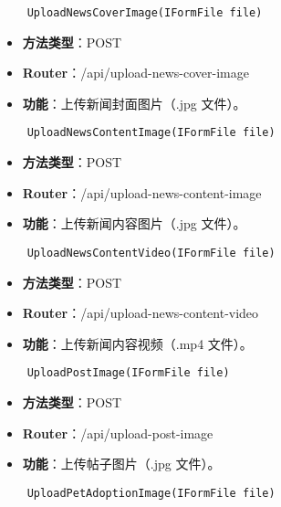 \begin{verbatim}
	UploadNewsCoverImage(IFormFile file)
\end{verbatim}

\begin{itemize}
	\item \textbf{方法类型}：POST
	\item \textbf{Router}：/api/upload-news-cover-image
	\item \textbf{功能}：上传新闻封面图片（.jpg 文件）。
\end{itemize}

\begin{verbatim}
	UploadNewsContentImage(IFormFile file)
\end{verbatim}

\begin{itemize}
	\item \textbf{方法类型}：POST
	\item \textbf{Router}：/api/upload-news-content-image
	\item \textbf{功能}：上传新闻内容图片（.jpg 文件）。
\end{itemize}

\begin{verbatim}
	UploadNewsContentVideo(IFormFile file)
\end{verbatim}

\begin{itemize}
	\item \textbf{方法类型}：POST
	\item \textbf{Router}：/api/upload-news-content-video
	\item \textbf{功能}：上传新闻内容视频（.mp4 文件）。
\end{itemize}

\begin{verbatim}
	UploadPostImage(IFormFile file)
\end{verbatim}

\begin{itemize}
	\item \textbf{方法类型}：POST
	\item \textbf{Router}：/api/upload-post-image
	\item \textbf{功能}：上传帖子图片（.jpg 文件）。
\end{itemize}

\begin{verbatim}
	UploadPetAdoptionImage(IFormFile file)
\end{verbatim}

